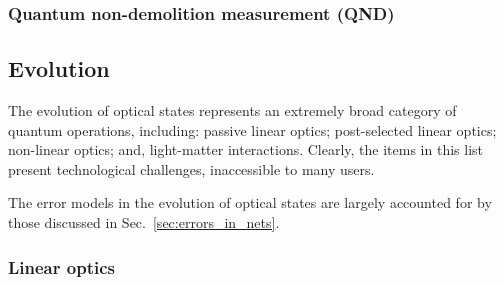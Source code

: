 \documentclass[aps, rmp, twocolumn, amsmath, amssymb, nofootinbib, superscriptaddress, longbibliography, floatfix, table-of-contents, eqsecnum]{revtex4-1}
\newcommand{\comment}[1]{{\color{blue}{\textbf{#1}}}}
\begin{document}
%
%

\subsubsection{Quantum non-demolition measurement (QND)}

\comment{To do!}

%
%

\subsection{Evolution}

The evolution of optical states represents an extremely broad category of quantum operations, including: passive linear optics; post-selected linear optics; non-linear optics; and, light-matter interactions. Clearly, the items in this list present technological challenges, inaccessible to many users.

The error models in the evolution of optical states are largely accounted for by those discussed in Sec.~\ref{sec:errors_in_nets}. 

%
%

\subsubsection{Linear optics} \label{sec:LO_ev_archs} 
\end{document}

